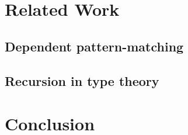 \section{Related Work}

\subsection{Dependent pattern-matching}
\cite{coquand92baastad}
\cite{CornesPhD,DBLP:conf/types/CornesT95}
\cite{DBLP:conf/birthday/GoguenMM06,mcbride:concon,DBLP:journals/jfp/McBrideM04,DBLP:conf/types/BradyMM03}
\cite{norell:thesis}
\cite{sozeau.thesis}

\subsection{Recursion in type theory}
\cite{boveetcappreta}
\cite{Barthe:2006gp}

\section{Conclusion}
